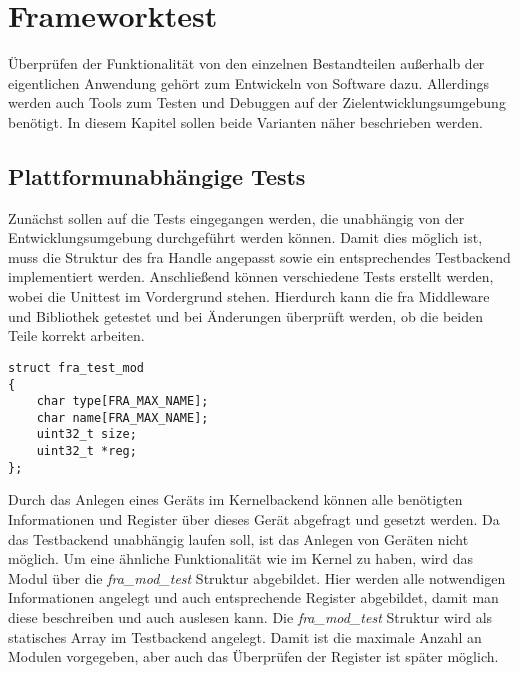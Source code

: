 \chapter{Frameworktest} \label{sec:test}
Überprüfen der Funktionalität von den einzelnen Bestandteilen außerhalb der eigentlichen Anwendung gehört zum Entwickeln von Software dazu. %
Allerdings werden auch Tools zum Testen und Debuggen auf der Zielentwicklungsumgebung benötigt. 
In diesem Kapitel sollen beide Varianten näher beschrieben werden.

\section{Plattformunabhängige Tests}
Zunächst sollen auf die Tests eingegangen werden, die unabhängig von der Entwicklungsumgebung durchgeführt werden können. 
Damit dies möglich ist, muss die Struktur des \ac{fra} Handle angepasst sowie ein entsprechendes Testbackend implementiert werden. Anschließend können verschiedene Tests erstellt werden, wobei die Unittest im Vordergrund stehen. Hierdurch kann die \ac{fra} Middleware und Bibliothek getestet und bei Änderungen überprüft werden, ob die beiden Teile korrekt arbeiten.

\begin{lstfloat}
\begin{lstlisting}
struct fra_test_mod
{
	char type[FRA_MAX_NAME];
	char name[FRA_MAX_NAME];
	uint32_t size;
	uint32_t *reg;
};
\end{lstlisting}
\end{lstfloat}

Durch das Anlegen eines Geräts im Kernelbackend können alle benötigten Informationen und Register über dieses Gerät abgefragt und gesetzt werden. Da das Testbackend unabhängig laufen soll, ist das Anlegen von Geräten nicht möglich. Um eine ähnliche Funktionalität wie im Kernel zu haben, wird das Modul über die \textit{fra\_mod\_test} Struktur abgebildet. Hier werden alle notwendigen Informationen angelegt und auch entsprechende Register abgebildet, damit man diese beschreiben und auch auslesen kann.
Die \textit{fra\_mod\_test} Struktur wird als statisches Array im Testbackend angelegt. Damit ist die maximale Anzahl an Modulen vorgegeben, aber auch das Überprüfen der Register ist später möglich.

